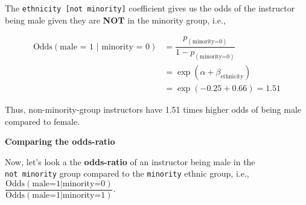 \documentclass[
  letterpaper,
  DIV=11,
  numbers=noendperiod]{scrartcl}
\begin{document}
The \texttt{ethnicity\ {[}not\ minority{]}} coefficient gives us the
odds of the instructor being male given they are \textbf{NOT} in the
minority group, i.e.,

\[
\begin{aligned}
\text{Odds}(\text{male = 1 | minority = 0}) &= \dfrac{p_{(\text{minority=0})}}{1- p_{(\text{minority=0})}}\\
&= \exp(\alpha + \beta_{\text{ethnicity}}) \\
&= \exp(-0.25 + 0.66) = 1.51
\end{aligned}
\]

Thus, non-minority-group instructors have 1.51 times higher odds of
being male compared to female.

\textbf{Comparing the odds-ratio}

Now, let's look a the \textbf{odds-ratio} of an instructor being male in
the \texttt{not\ minority} group compared to the \texttt{minority}
ethnic group, i.e.,
\(\dfrac{\text{Odds}(\text{male=1|minority=0})}{\text{Odds}(\text{male=1|minority=1})}\).
\end{document}
